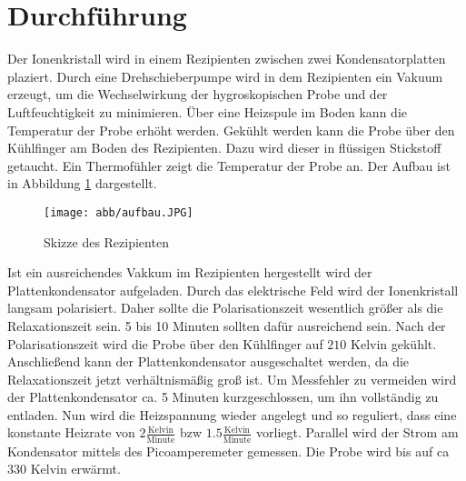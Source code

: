 \section{Durchführung}
\label{sec:Durchführung}

Der Ionenkristall wird in einem Rezipienten zwischen zwei Kondensatorplatten plaziert.
Durch eine Drehschieberpumpe wird in dem Rezipienten ein Vakuum erzeugt,
um die Wechselwirkung der hygroskopischen Probe und der Luftfeuchtigkeit zu minimieren.
Über eine Heizspule im Boden kann die Temperatur der Probe erhöht werden.
Gekühlt werden kann die Probe über den Kühlfinger am Boden des Rezipienten.
Dazu wird dieser in flüssigen Stickstoff getaucht.
Ein Thermofühler zeigt die Temperatur der Probe an.
Der Aufbau ist in Abbildung \ref{abb:aufbau} dargestellt.
\begin{figure}[h] 
    \centering
    \texttt{[image: abb/aufbau.JPG]}
    \caption{Skizze des Rezipienten \cite{sample}}
    \label{abb:aufbau}
\end{figure}
Ist ein ausreichendes Vakkum im Rezipienten hergestellt wird der Plattenkondensator aufgeladen.
Durch das elektrische Feld wird der Ionenkristall langsam polarisiert.
Daher sollte die Polarisationszeit wesentlich größer als die Relaxationszeit sein.
5 bis 10 Minuten sollten dafür ausreichend sein.
Nach der Polarisationszeit wird die Probe über den Kühlfinger auf $210$ Kelvin gekühlt.
Anschließend kann der Plattenkondensator ausgeschaltet werden,
da die Relaxationszeit jetzt verhältnismäßig groß ist.
Um Messfehler zu vermeiden wird der Plattenkondensator ca. 5 Minuten kurzgeschlossen, 
um ihn vollständig zu entladen.
Nun wird die Heizspannung wieder angelegt und so reguliert,
dass eine konstante Heizrate von $2 \frac{\text{Kelvin}}{\text{Minute}}$ bzw $1.5 \frac{\text{Kelvin}}{\text{Minute}}$ vorliegt.
Parallel wird der Strom am Kondensator mittels des Picoamperemeter gemessen.
Die Probe wird bis auf ca $330$ Kelvin erwärmt.
